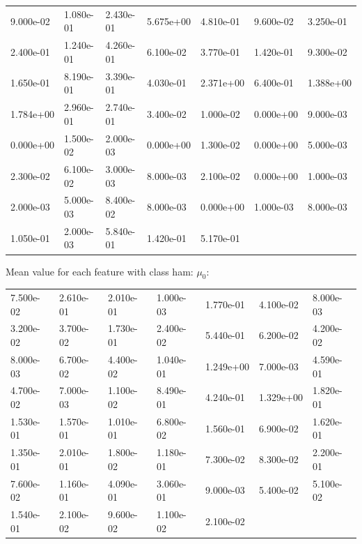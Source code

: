 \documentclass[11pt,a4paper]{article}
\begin{document}
\begin{table}[!htbp]
	\begin{tabularx}{\linewidth}{|l|l|l|l|l|l|l|}
	\cline{1-7}
	\centering 9.000e-02 & 1.080e-01 & 2.430e-01 & 5.675e+00 & 4.810e-01 & 9.600e-02 & 3.250e-01 \\ 
	\cline{1-7}
	\centering 2.400e-01 & 1.240e-01 & 4.260e-01 & 6.100e-02 & 3.770e-01 & 1.420e-01 & 9.300e-02 \\ 
	\cline{1-7}
	\centering 1.650e-01 & 8.190e-01 & 3.390e-01 & 4.030e-01 & 2.371e+00 & 6.400e-01 & 1.388e+00 \\ 
	\cline{1-7}
	\centering 1.784e+00 & 2.960e-01 & 2.740e-01 & 3.400e-02 & 1.000e-02 & 0.000e+00 & 9.000e-03 \\ 
	\cline{1-7}
	\centering 0.000e+00 & 1.500e-02 & 2.000e-03 & 0.000e+00 & 1.300e-02 & 0.000e+00 & 5.000e-03 \\ 
	\cline{1-7}
	\centering 2.300e-02 & 6.100e-02 & 3.000e-03 & 8.000e-03 & 2.100e-02 & 0.000e+00 & 1.000e-03 \\ 
	\cline{1-7}
	\centering 2.000e-03 & 5.000e-03 & 8.400e-02 & 8.000e-03 & 0.000e+00 & 1.000e-03 & 8.000e-03 \\ 
	\cline{1-7}
	\centering 1.050e-01 & 2.000e-03 & 5.840e-01 & 1.420e-01 & 5.170e-01 & & \\
	\cline{1-7}
	\end{tabularx}
\end{table}



Mean value for each feature with class ham: $\mu_0$:

\begin{table}[!htbp]
	\begin{tabularx}{\linewidth}{|l|l|l|l|l|l|l|}
		\cline{1-7}
		\centering 7.500e-02 & 2.610e-01 & 2.010e-01 & 1.000e-03 & 1.770e-01 & 4.100e-02 & 8.000e-03 \\
		\cline{1-7}
		\centering 3.200e-02 & 3.700e-02 & 1.730e-01 & 2.400e-02 & 5.440e-01 & 6.200e-02 & 4.200e-02 \\
		\cline{1-7}
		\centering 8.000e-03 & 6.700e-02 & 4.400e-02 & 1.040e-01 & 1.249e+00 & 7.000e-03 & 4.590e-01 \\
		\cline{1-7}
		\centering 4.700e-02 & 7.000e-03 & 1.100e-02 & 8.490e-01 & 4.240e-01 & 1.329e+00 & 1.820e-01 \\
		\cline{1-7}
		\centering 1.530e-01 & 1.570e-01 & 1.010e-01 & 6.800e-02 & 1.560e-01 & 6.900e-02 & 1.620e-01 \\
		\cline{1-7}
		\centering 1.350e-01 & 2.010e-01 & 1.800e-02 & 1.180e-01 & 7.300e-02 & 8.300e-02 & 2.200e-01 \\
		\cline{1-7}
		\centering 7.600e-02 & 1.160e-01 & 4.090e-01 & 3.060e-01 & 9.000e-03 & 5.400e-02 & 5.100e-02 \\
		\cline{1-7}
		\centering 1.540e-01 & 2.100e-02 & 9.600e-02 & 1.100e-02 & 2.100e-02 & &  \\
		\cline{1-7}
	\end{tabularx}
\end{table}
\end{document}

